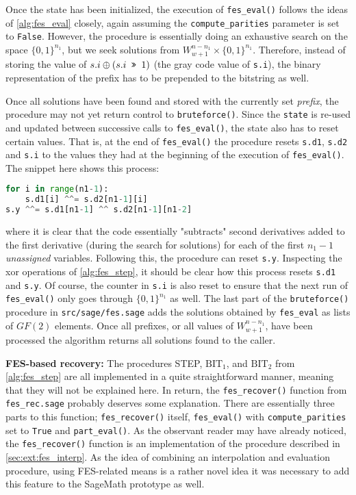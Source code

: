 Once the state has been initialized, the execution of \texttt{fes\_eval()} follows the ideas of \cref{alg:fes_eval} closely, again assuming the \texttt{compute\_parities} parameter is set to \texttt{False}. However, the procedure is essentially doing an exhaustive search on the space $\{0,1\}^{n_1}$, but we seek solutions from $W^{n - n_1}_{w + 1} \times \{0, 1\}^{n_1}$. Therefore, instead of storing the value of $s.i \oplus (s.i \texttt{ >> } 1)$ (the gray code value of \texttt{s.i}), the binary representation of the prefix has to be prepended to the bitstring as well. 

Once all solutions have been found and stored with the currently set \textit{prefix}, the procedure may not yet return control to \texttt{bruteforce()}. Since the \texttt{state} is re-used and updated between successive calls to \texttt{fes\_eval()}, the state also has to reset certain values. That is, at the end of \texttt{fes\_eval()} the procedure resets \texttt{s.d1}, \texttt{s.d2} and \texttt{s.i} to the values they had at the beginning of the execution of \texttt{fes\_eval()}. The snippet here shows this process:
\begin{lstlisting}[language=Python,style=mystyle]
for i in range(n1-1):
    s.d1[i] ^^= s.d2[n1-1][i]
s.y ^^= s.d1[n1-1] ^^ s.d2[n1-1][n1-2]
\end{lstlisting}
where it is clear that the code essentially "subtracts" second derivatives added to the first derivative (during the search for solutions) for each of the first $n_1-1$ \textit{unassigned} variables. Following this, the procedure can reset \texttt{s.y}. Inspecting the xor operations of \cref{alg:fes_step}, it should be clear how this process resets \texttt{s.d1} and \texttt{s.y}. Of course, the counter in \texttt{s.i} is also reset to ensure that the next run of \texttt{fes\_eval()} only goes through $\{0,1\}^{n_1}$ as well. 
The last part of the \texttt{bruteforce()} procedure in \texttt{src/sage/fes.sage} adds the solutions obtained by \texttt{fes\_eval} as lists of $GF(2)$ elements. Once all prefixes, or all values of $W^{n - n_1}_{w + 1}$, have been processed the algorithm returns all solutions found to the caller.

\textbf{FES-based recovery:} The procedures STEP, $\text{BIT}_1$, and $\text{BIT}_2$ from \cref{alg:fes_step} are all implemented in a quite straightforward manner, meaning that they will not be explained here. In return, the \texttt{fes\_recover()} function from \texttt{fes\_rec.sage} probably deserves some explanation. There are essentially three parts to this function; \texttt{fes\_recover()} itself, \texttt{fes\_eval()} with \texttt{compute\_parities} set to \texttt{True} and \texttt{part\_eval()}. As the observant reader may have already noticed, the \texttt{fes\_recover()} function is an implementation of the procedure described in \cref{sec:ext:fes_interp}. As the idea of combining an interpolation and evaluation procedure, using FES-related means is a rather novel idea it was necessary to add this feature to the SageMath prototype as well. 

